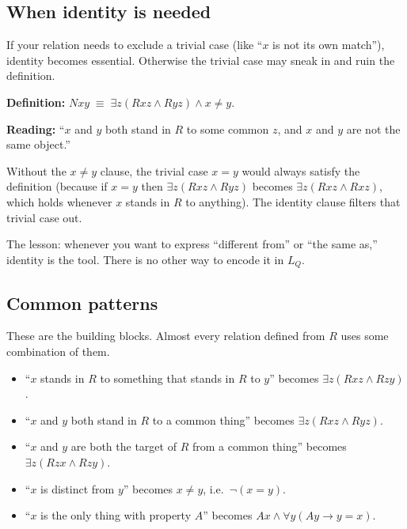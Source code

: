 \documentclass[11pt]{article}
\begin{document}
\subsection{When identity is needed}

If your relation needs to exclude a trivial case (like ``$x$ is not its own match''), identity becomes essential. Otherwise the trivial case may sneak in and ruin the definition.

\begin{example}
\textbf{Definition:} $Nxy \;\equiv\; \exists z(Rxz \wedge Ryz) \wedge x \neq y$.

\textbf{Reading:} ``$x$ and $y$ both stand in $R$ to some common $z$, and $x$ and $y$ are not the same object.''

Without the $x \neq y$ clause, the trivial case $x = y$ would always satisfy the definition (because if $x = y$ then $\exists z(Rxz \wedge Ryz)$ becomes $\exists z(Rxz \wedge Rxz)$, which holds whenever $x$ stands in $R$ to anything). The identity clause filters that trivial case out.
\end{example}

The lesson: whenever you want to express ``different from'' or ``the same as,'' identity is the tool. There is no other way to encode it in $L_Q$.

\subsection{Common patterns}

These are the building blocks. Almost every relation defined from $R$ uses some combination of them.

\begin{itemize}[leftmargin=*]
    \item ``$x$ stands in $R$ to something that stands in $R$ to $y$'' becomes $\exists z(Rxz \wedge Rzy)$.
    \item ``$x$ and $y$ both stand in $R$ to a common thing'' becomes $\exists z(Rxz \wedge Ryz)$.
    \item ``$x$ and $y$ are both the target of $R$ from a common thing'' becomes $\exists z(Rzx \wedge Rzy)$.
    \item ``$x$ is distinct from $y$'' becomes $x \neq y$, i.e.~$\neg(x = y)$.
    \item ``$x$ is the only thing with property $A$'' becomes $Ax \wedge \forall y(Ay \to y = x)$.
\end{itemize}
\end{document}
